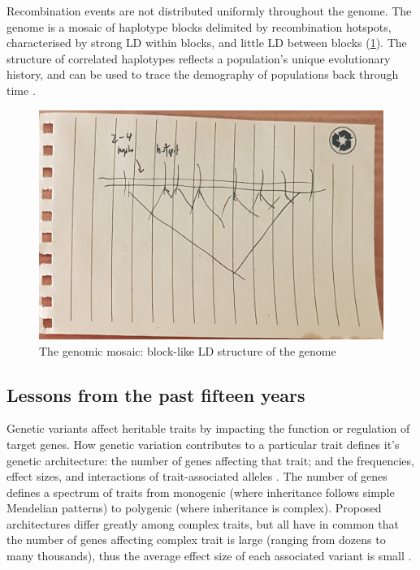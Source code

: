 \begin{outline}
Recombination events are not distributed uniformly throughout the genome.
The genome is a mosaic of haplotype blocks delimited by recombination hotspots, 
characterised by strong \gls{LD} within blocks, and little \gls{LD} between blocks \autocite{wall2003HaplotypeBlocksLinkage,theinternationalhapmapconsortium2007SecondGenerationHuman} (\cref{fig:intro_haplotypeBlocks}).
The structure of correlated haplotypes reflects a population's unique evolutionary history, and can be used to trace the demography of populations back through time \autocite{karczewski2020AnalyticTranslationalGenetics}.

\begin{figure}
    \centering
    \includegraphics[width=1.0\textwidth,page=1]{mainmatter/figures/chapter_01/fig_mockup_haplotypeBlocks_Screenshot 2020-05-21 at 17.08.33.png}
    \caption{The genomic mosaic: block-like \gls{LD} structure of the genome}
    \label{fig:intro_haplotypeBlocks}
\end{figure}

\subsection{Lessons from the past fifteen years}

Genetic variants affect heritable traits by impacting the function or regulation of target genes.
How genetic variation contributes to a particular trait defines it's genetic architecture: 
the number of genes affecting that trait; and the frequencies, effect sizes, and interactions of trait-associated alleles \autocite{visscher2019Fisher1918Paper}.
The number of genes defines a spectrum of traits from monogenic (where inheritance follows simple Mendelian patterns) to polygenic (where inheritance is complex).
Proposed architectures differ greatly among complex traits, 
but all have in common that the number of genes affecting complex trait is large (ranging from dozens to many thousands),
thus the average effect size of each associated variant is small \autocite{hindorff2009PotentialEtiologicFunctional,gibson2011RareCommonVariants,boyle2017ExpandedViewComplex}.


\end{outline}
